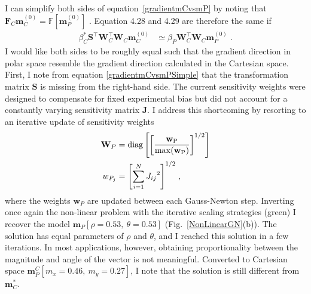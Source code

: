 I can simplify both sides of equation~\eqref{gradientmCvsmP} by noting that $\mathbf{F}_C \mathbf{m}_C^{(0)} = \mathbb{F}[ \mathbf{m}_P^{(0)}]$ . Equation 4.28 and 4.29 are therefore the same if 
\begin{equation}\label{gradientmCvsmPSimple}
\begin{split}
\beta_C^* \mathbf{S}^\top \mathbf{W}_C^\top\mathbf{W}_C \mathbf{m}_C^{(0)} & \simeq \beta_P \mathbf{W}_C^\top\mathbf{W}_C \mathbf{m}_P^{(0)}\;.
\end{split}
\end{equation}
I would like both sides to be roughly equal such that the gradient direction in polar space resemble the gradient direction calculated in the Cartesian space.
First, I note from equation \eqref{gradientmCvsmPSimple} that the transformation matrix $\mathbf{S}$ is missing from the right-hand side. The current sensitivity weights were designed to compensate for fixed experimental bias but did not account for a constantly varying sensitivity matrix $\mathbf{J}$. I address this shortcoming by resorting to an iterative update of sensitivity weights
\begin{equation}
\begin{split}
\mathbf{W}_P &= \rm{diag} \left[ {\left[\frac{\mathbf{ w}_P}{\rm{max}(\mathbf{w}_P)}\right]}^{1/2}\right]\\
w_{P_j} &= {\left[\sum_{i=1}^{N}{J_{ij}}^2 \right]}^{1/2}\;,
\end{split}
\end{equation}
where the weights $\mathbf{w}_P$ are updated between each Gauss-Newton step.
Inverting once again the non-linear problem with the iterative scaling strategies (green) I recover the model $\mathbf{m}_P[\rho=0.53,\: \theta=0.53]$ (Fig.~\ref{NonLinearGN}(b)). The solution has equal parameters of $\rho$ and $\theta$, and I reached this solution in a few iterations. In most applications, however, obtaining proportionality between the magnitude and angle of the vector is not meaningful. Converted to Cartesian space $\mathbf{m}_P^C[m_x=0.46,\: m_y=0.27]$, I note that the solution is still different from $\mathbf{m}_C^*$.

